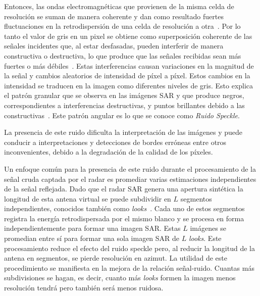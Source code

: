 Entonces, las ondas electromagnéticas que provienen de la misma celda de resolución se suman de manera coherente y dan como resultado fuertes fluctuaciones en la retrodispersión de una celda de resolución a otra~\cite{oliverquegan98}. Por lo tanto el valor de gris en un pixel se obtiene como superposición coherente de las señales incidentes que, al estar desfasadas, pueden interferir de manera constructiva o destructiva, lo que produce que las señales recibidas sean más fuertes o más débiles~\cite{Shahrezaei2019}. Estas interferencias causan variaciones en la magnitud de la señal y cambios aleatorios de intensidad de píxel a píxel. Estos cambios en la intensidad se traducen en la imagen como diferentes niveles de gris. Esto explica el patrón granular que se observa en las imágenes SAR y que produce negros, correspondientes a interferencias destructivas, y puntos brillantes debido a las constructivas~\cite{Yahya2014}. Este patrón angular es lo que se conoce como \textit{Ruido Speckle}.

La presencia de este ruido dificulta la interpretación de las imágenes y puede conducir a interpretaciones y detecciones de bordes erróneas entre otros inconvenientes, debido a la degradación de la calidad de los píxeles. 

Un enfoque común para la presencia de este ruido durante el procesamiento de la señal cruda captada por el radar es promediar varias estimaciones independientes de la señal reflejada. Dado que el radar SAR genera una apertura sintética la longitud de esta antena virtual se puede subdividir en $L$  segmentos independientes, conocidos también como \textit{looks}~\cite{Lee2009}. Cada uno de estos segmentos registra la energía retrodispersada por el mismo blanco y se procesa en forma independientemente para formar una imagen SAR. Estas $L$ imágenes se promedian entre sí para formar una sola imagen SAR de $L$ \textit{looks}. Este procesamiento reduce el efecto del ruido speckle pero, al reducir la longitud de la antena en segmentos, se pierde resolución en azimut. La utilidad de este procedimiento se manifiesta en la mejora de la relación señal-ruido. Cuantas más subdivisiones se hagan, es decir, cuanto más \textit{looks} formen la imagen menos resolución tendrá pero también será menos ruidosa.

